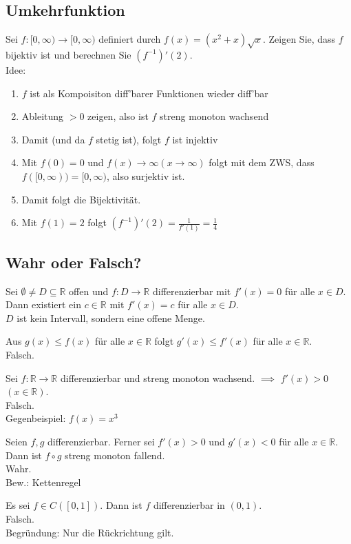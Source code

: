 \documentclass[parskip=full]{scrartcl}
\begin{document}
\subsection{Umkehrfunktion}
Sei $f: [0,\infty) \to [0,\infty)$ definiert durch $f(x) = (x^2 + x)\sqrt{x}$.
Zeigen Sie, dass $f$ bijektiv ist und berechnen Sie $(f^{-1})'(2)$.\\
Idee:
\begin{enumerate}
    \item $f$ ist als Kompoisiton diff'barer Funktionen wieder diff'bar
    \item Ableitung $> 0$ zeigen, also ist $f$ streng monoton wachsend
    \item Damit (und da $f$ stetig ist), folgt $f$ ist injektiv
    \item Mit $f(0) = 0$ und $f(x) \to \infty (x \to \infty)$ folgt mit dem ZWS, dass $f([0,\infty)) = [0,\infty)$, also surjektiv ist.
    \item Damit folgt die Bijektivität.
    \item Mit $f(1) = 2$ folgt $(f^{-1})'(2) = \frac{1}{f'(1)} = \frac{1}{4}$
\end{enumerate}

\subsection{Wahr oder Falsch?}
Sei $\emptyset \neq D \subseteq \mathbb{R}$ offen und $f:D \to \mathbb{R}$ differenzierbar mit $f'(x) = 0$ für alle $x \in D$. 
Dann existiert ein $c \in \mathbb{R}$ mit $f'(x) = c$ für alle $x \in D$.\\
$D$ ist kein Intervall, sondern eine offene Menge.

Aus $g(x) \leq f(x)$ für alle $x \in \mathbb{R}$ folgt $g'(x) \leq f'(x)$ für alle $x \in \mathbb{R}$.\\
Falsch.

Sei $f: \mathbb{R} \to \mathbb{R}$ differenzierbar und streng monoton wachsend. $\implies$ $f'(x) > 0$ $(x \in \mathbb{R})$.\\
Falsch.\\
Gegenbeispiel: $f(x) = x^3$

Seien $f,g$ differenzierbar.
Ferner sei $f'(x) > 0$ und $g'(x) < 0$ für alle $x \in \mathbb{R}$.
Dann ist $f \circ g$ streng monoton fallend.\\
Wahr.\\
Bew.: Kettenregel

Es sei $f \in C([0,1])$.
Dann ist $f$ differenzierbar in $(0,1)$.\\
Falsch.\\
Begründung: Nur die Rückrichtung gilt.
\end{document}
